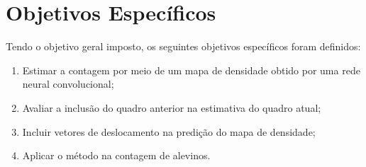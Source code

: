 
\section{Objetivos Específicos}


Tendo o objetivo geral imposto, os seguintes objetivos específicos foram definidos:
%
\begin{enumerate}
    \item Estimar a contagem por meio de um mapa de densidade obtido por uma rede neural convolucional;
    \item Avaliar a inclusão do quadro anterior na estimativa do quadro atual;
    \item Incluir vetores de deslocamento na predição do mapa de densidade;
    \item Aplicar o método na contagem de alevinos.

\end{enumerate}


